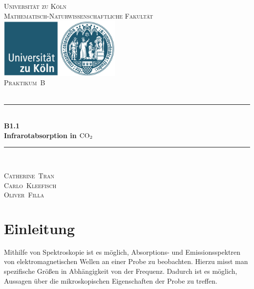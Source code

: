 \documentclass[12pt,a4paper]{scrartcl}
\numberwithin{equation}{section} %
\newcommand{\HRule}{\rule{\linewidth}{0.7mm}}
\begin{document}
\begin{titlepage}
	\pagestyle{empty}

	\begin{center}

	\textsc{\LARGE Universität zu Köln }\\ [0.4cm]
	\textsc{Mathematisch-Naturwissenschaftliche Fakultät} \\[1.5cm]

	\includegraphics[width=0.45\textwidth]{../media/uni.jpg}\\[1.5cm]  %

	\textsc{\Large Praktikum~B}\\[2mm]
	\textsc{}\\[10mm]
	\HRule \\[0.4cm]

		{	\Huge \bfseries B1.1}\\[0.4cm]
			{	\huge \bfseries Infrarotabsorption in $\ce{CO_2}$}\\[0.3cm]
	
	\HRule \\[3cm]

 	\begin{center}
		\textsc{\Large Catherine~Tran } \\[3pt]
		\textsc{\Large Carlo~Kleefisch } \\[3pt]
		\textsc{\Large Oliver~Filla } \\[3pt]
	\end{center}
	\end{center}
\end{titlepage}

\newpage
\tableofcontents
\newpage

\hypertarget{einleitung}{%
\section{Einleitung}\label{einleitung}}

Mithilfe von Spektroskopie ist es möglich, Absorptions- und Emissionsspektren von elektromagnetischen Wellen an einer Probe zu beobachten. Hierzu misst man spezifische Größen in Abhängigkeit von der Frequenz. Dadurch ist es möglich, Aussagen über die mikroskopischen Eigenschaften der Probe zu treffen.
\end{document}
